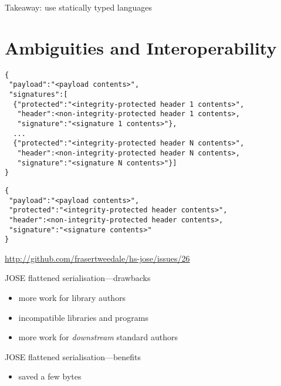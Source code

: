 \documentclass[ignorenonframetext,aspectratio=43]{beamer}
\providecommand{\tightlist}{%
  \setlength{\itemsep}{0pt}\setlength{\parskip}{0pt}}
\begin{document}
\begin{frame}[plain]
\huge
Takeaway: use statically typed languages
\end{frame}




\section{Ambiguities and Interoperability}

\begin{frame}[fragile]
\begin{verbatim}
{
 "payload":"<payload contents>",
 "signatures":[
  {"protected":"<integrity-protected header 1 contents>",
   "header":<non-integrity-protected header 1 contents>,
   "signature":"<signature 1 contents>"},
  ...
  {"protected":"<integrity-protected header N contents>",
   "header":<non-integrity-protected header N contents>,
   "signature":"<signature N contents>"}]
}
\end{verbatim}
\end{frame}

\begin{frame}[fragile]
\begin{verbatim}
{
 "payload":"<payload contents>",
 "protected":"<integrity-protected header contents>",
 "header":<non-integrity-protected header contents>,
 "signature":"<signature contents>"
}
\end{verbatim}
\end{frame}

\begin{frame}[plain]
\begin{center}
\end{center}
\tiny \url{http://github.com/frasertweedale/hs-jose/issues/26}
\end{frame}

\begin{frame}{JOSE flattened serialisation---drawbacks}
\begin{itemize}
\tightlist
\item more work for library authors
\item incompatible libraries and programs
\item more work for {\em downstream} standard authors
\end{itemize}
\end{frame}

\begin{frame}{JOSE flattened serialisation---benefits}
\begin{itemize}
\tightlist
\item saved a few bytes
\end{itemize}
\end{frame}
\end{document}
